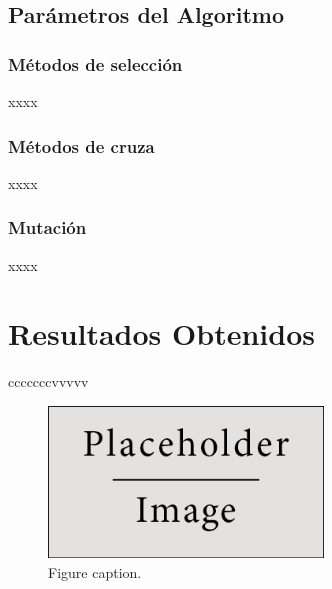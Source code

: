 \documentclass{article}
\begin{document}




\subsection{Par\'ametros del Algoritmo}

\subsubsection{M\'etodos de selecci\'on}
\label{metodos de seleccion}
xxxx

\subsubsection{M\'etodos de cruza}
\label{metodos de cruza}
xxxx

\subsubsection{Mutaci\'on}
\label{mutacion}
xxxx




\section{Resultados Obtenidos}
cccccccvvvvv

\begin{figure}[h]
\begin{center}
\includegraphics[width=0.65\textwidth]{placeholder} %
\caption{Figure caption.}
\end{center}
\end{figure}
\end{document}
